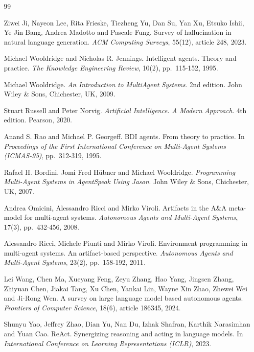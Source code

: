\documentclass[11pt,a4paper]{article}
\begin{document}
\begin{thebibliography}{99}
\small

Ziwei Ji, Nayeon Lee, Rita Frieske, Tiezheng Yu, Dan Su, Yan Xu, Etsuko Ishii, Ye Jin Bang, Andrea
Madotto and Pascale Fung. Survey of hallucination in natural language generation. \emph{ACM Computing
Surveys}, 55(12), article 248, 2023.

Michael Wooldridge and Nicholas R. Jennings. Intelligent agents. Theory and practice. \emph{The
Knowledge Engineering Review}, 10(2), pp.~115-152, 1995.

Michael Wooldridge. \emph{An Introduction to MultiAgent Systems}. 2nd edition. John Wiley \& Sons,
Chichester, UK, 2009.

Stuart Russell and Peter Norvig. \emph{Artificial Intelligence. A Modern Approach}. 4th edition.
Pearson, 2020.

Anand S. Rao and Michael P. Georgeff. BDI agents. From theory to practice. In \emph{Proceedings of the
First International Conference on Multi-Agent Systems (ICMAS-95)}, pp.~312-319, 1995.

Rafael H. Bordini, Jomi Fred H\"ubner and Michael Wooldridge. \emph{Programming Multi-Agent Systems in
AgentSpeak Using Jason}. John Wiley \& Sons, Chichester, UK, 2007.

Andrea Omicini, Alessandro Ricci and Mirko Viroli. Artifacts in the A\&A meta-model for multi-agent
systems. \emph{Autonomous Agents and Multi-Agent Systems}, 17(3), pp.~432-456, 2008.

Alessandro Ricci, Michele Piunti and Mirko Viroli. Environment programming in multi-agent systems. An
artifact-based perspective. \emph{Autonomous Agents and Multi-Agent Systems}, 23(2), pp.~158-192, 2011.

Lei Wang, Chen Ma, Xueyang Feng, Zeyu Zhang, Hao Yang, Jingsen Zhang, Zhiyuan Chen, Jiakai Tang, Xu
Chen, Yankai Lin, Wayne Xin Zhao, Zhewei Wei and Ji-Rong Wen. A survey on large language model based
autonomous agents. \emph{Frontiers of Computer Science}, 18(6), article 186345, 2024.

Shunyu Yao, Jeffrey Zhao, Dian Yu, Nan Du, Izhak Shafran, Karthik Narasimhan and Yuan Cao. ReAct.
Synergizing reasoning and acting in language models. In \emph{International Conference on Learning
Representations (ICLR)}, 2023.


\end{thebibliography}
\end{document}
